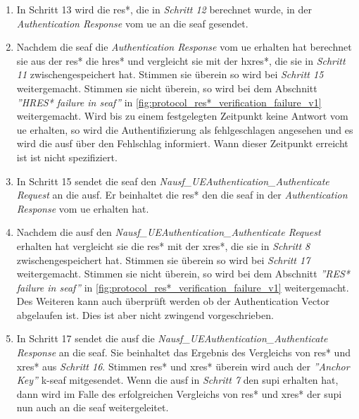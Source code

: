 \begin{enumerate}
\item In Schritt 13 wird die \gls{res*}, die in \textit{Schritt 12} berechnet wurde, in der \textit{Authentication Response} vom \gls{ue} an die \gls{seaf} gesendet.

\item Nachdem die \gls{seaf} die \textit{Authentication Response} vom \gls{ue} erhalten hat berechnet sie aus der \gls{res*} die \gls{hres*} und vergleicht sie mit der \gls{hxres*}, die sie in \textit{Schritt 11} zwischengespeichert hat.
Stimmen sie \"uberein so wird bei \textit{Schritt 15} weitergemacht.
Stimmen sie nicht \"uberein, so wird bei dem Abschnitt \textit{''HRES* failure in \gls{seaf}''} in \cref{fig:protocol_res*_verification_failure_v1} weitergemacht.
Wird bis zu einem festgelegten Zeitpunkt keine Antwort vom \gls{ue} erhalten, so wird die Authentifizierung als fehlgeschlagen angesehen und es wird die \gls{ausf} \"uber den Fehlschlag informiert.
Wann dieser Zeitpunkt erreicht ist ist nicht spezifiziert.

\item In Schritt 15 sendet die \gls{seaf} den \textit{Nausf\_UEAuthentication\_Authenticate Request} an die \gls{ausf}.
Er beinhaltet die \gls{res*} den die \gls{seaf} in der \textit{Authentication Response} vom \gls{ue} erhalten hat.

\item Nachdem die \gls{ausf} den \textit{Nausf\_UEAuthentication\_Authenticate Request} erhalten hat vergleicht sie die \gls{res*} mit der \gls{xres*}, die sie in \textit{Schritt 8} zwischengespeichert hat.
Stimmen sie \"uberein so wird bei \textit{Schritt 17} weitergemacht.
Stimmen sie nicht \"uberein, so wird bei dem Abschnitt \textit{''RES* failure in \gls{seaf}''} in \cref{fig:protocol_res*_verification_failure_v1} weitergemacht.
Des Weiteren kann auch \"uberpr\"uft werden ob der Authentication Vector abgelaufen ist.
Dies ist aber nicht zwingend vorgeschrieben.

\item In Schritt 17 sendet die \gls{ausf} die \textit{Nausf\_UEAuthentication\_Authenticate Response} an die \gls{seaf}.
Sie beinhaltet das Ergebnis des Vergleichs von \gls{res*} und \gls{xres*} aus \textit{Schritt 16}.
Stimmen \gls{res*} und \gls{xres*} \"uberein wird auch der \textit{''Anchor Key''} \gls{k-seaf} mitgesendet.
Wenn die \gls{ausf} in \textit{Schritt 7} den \gls{supi} erhalten hat, dann wird im Falle des erfolgreichen Vergleichs von \gls{res*} und \gls{xres*} der \gls{supi} nun auch an die \gls{seaf} weitergeleitet.
\end{enumerate}


